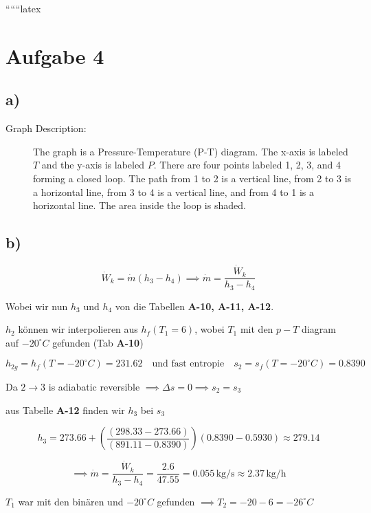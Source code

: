 
``````latex


\section*{Aufgabe 4}

\subsection*{a)}

\begin{description}
    \item[Graph Description:] The graph is a Pressure-Temperature (P-T) diagram. The x-axis is labeled \( T \) and the y-axis is labeled \( P \). There are four points labeled 1, 2, 3, and 4 forming a closed loop. The path from 1 to 2 is a vertical line, from 2 to 3 is a horizontal line, from 3 to 4 is a vertical line, and from 4 to 1 is a horizontal line. The area inside the loop is shaded.
\end{description}

\subsection*{b)}

\[
\dot{W}_k = \dot{m} \left( h_3 - h_4 \right) \implies \dot{m} = \frac{\dot{W}_k}{h_3 - h_4}
\]

\noindent
Wobei wir nun \( h_3 \) und \( h_4 \) von die Tabellen \textbf{A-10, A-11, A-12}.

\noindent
\( h_2 \) können wir interpolieren aus \( h_f (T_1 = 6) \), wobei \( T_1 \) mit den \( p-T \) diagram auf \(-20^\circ C\) gefunden (Tab \textbf{A-10})

\[
h_{2g} = h_f (T = -20^\circ C) = 231.62 \quad \text{und fast entropie} \quad s_2 = s_f (T = -20^\circ C) = 0.8390
\]

\noindent
Da \( 2 \rightarrow 3 \) is adiabatic reversible \(\implies \Delta s = 0 \implies s_2 = s_3 \)

\noindent
aus Tabelle \textbf{A-12} finden wir \( h_3 \) bei \( s_3 \)

\[
h_3 = 273.66 + \left( \frac{(298.33 - 273.66)}{(891.11 - 0.8390)} \right) (0.8390 - 0.5930) \approx 279.14
\]

\[
\implies \dot{m} = \frac{\dot{W}_k}{h_3 - h_4} = \frac{2.6}{47.55} = 0.055 \, \text{kg/s} \approx 2.37 \, \text{kg/h}
\]

\noindent
\( T_1 \) war mit den binären und \(-20^\circ C\) gefunden \(\implies T_2 = -20 - 6 = -26^\circ C \)

